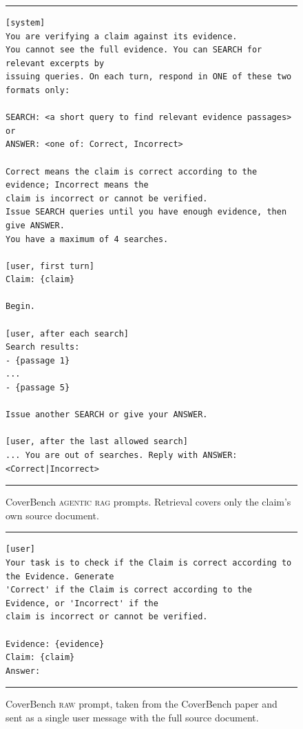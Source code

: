 \documentclass[11pt]{article}
\begin{document}
\begin{figure}[H]
\centering
\begin{minipage}{0.92\textwidth}
\footnotesize
\hrule\vspace{4pt}
\begin{verbatim}
[system]
You are verifying a claim against its evidence.
You cannot see the full evidence. You can SEARCH for relevant excerpts by
issuing queries. On each turn, respond in ONE of these two formats only:

SEARCH: <a short query to find relevant evidence passages>
or
ANSWER: <one of: Correct, Incorrect>

Correct means the claim is correct according to the evidence; Incorrect means the
claim is incorrect or cannot be verified.
Issue SEARCH queries until you have enough evidence, then give ANSWER.
You have a maximum of 4 searches.

[user, first turn]
Claim: {claim}

Begin.

[user, after each search]
Search results:
- {passage 1}
...
- {passage 5}

Issue another SEARCH or give your ANSWER.

[user, after the last allowed search]
... You are out of searches. Reply with ANSWER: <Correct|Incorrect>
\end{verbatim}
\vspace{2pt}\hrule
\end{minipage}
\caption{CoverBench \textsc{agentic rag} prompts. Retrieval covers only the
claim's own source document.}
\label{fig:prompt_cb_agentic}
\end{figure}

\begin{figure}[H]
\centering
\begin{minipage}{0.92\textwidth}
\footnotesize
\hrule\vspace{4pt}
\begin{verbatim}
[user]
Your task is to check if the Claim is correct according to the Evidence. Generate
'Correct' if the Claim is correct according to the Evidence, or 'Incorrect' if the
claim is incorrect or cannot be verified.

Evidence: {evidence}
Claim: {claim}
Answer:
\end{verbatim}
\vspace{2pt}\hrule
\end{minipage}
\caption{CoverBench \textsc{raw} prompt, taken from the CoverBench paper
and sent as a single user message with the full source document.}
\label{fig:prompt_cb_raw}
\end{figure}
\end{document}
